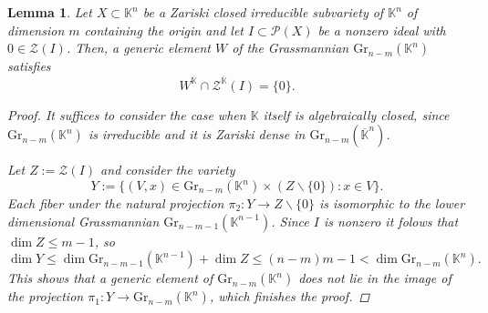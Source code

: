 \documentclass[10pt,a4paper]{amsart}
\newtheorem{lem}{Lemma}
\newcommand{\K}{\mathbb{K}}
\newcommand{\PP}{\mathcal{P}}
\newcommand{\Z}{\mathcal{Z}}
\begin{document}
\begin{lem}\label{generic}
Let $X\subset \K^n$ be a Zariski closed irreducible subvariety of $\K^n$ of dimension $m$ containing the origin and let $I\subset \PP(X)$ be a nonzero ideal with $0\in\Z(I)$. Then, a generic element $W$ of the Grassmannian $\mathrm{Gr}_{n-m}(\K^n)$ satisfies
\begin{equation*}
   W^{\overline{\K}}\cap \Z^{\overline{\K}}(I)=\{0\}.  
\end{equation*}
\begin{proof}
It suffices to consider the case when $\K$ itself is algebraically closed, since $\mathrm{Gr}_{n-m}(\K^n)$ is irreducible and it is Zariski dense in $\mathrm{Gr}_{n-m}(\overline{\K}^n)$. 

 

Let $Z:=\Z(I)$ and consider the variety
\begin{equation*}
    Y:=\{(V,x)\in\mathrm{Gr}_{n-m}(\K^n)\times (Z\backslash \{0\}):x\in V\}. 
\end{equation*}
Each fiber under the natural projection $\pi_2:Y\rightarrow Z\backslash \{0\}$ is isomorphic to the lower dimensional Grassmannian $\mathrm{Gr}_{n-m-1}(\K^{n-1})$. Since $I$ is nonzero it folows that $\dim Z\leq m-1$, so 
\begin{equation*}
    \dim Y\leq \dim \mathrm{Gr}_{n-m-1}(\K^{n-1})+\dim Z\leq(n-m)m-1<\dim \mathrm{Gr}_{n-m}(\K^n).
\end{equation*}
This shows that a generic element of $\mathrm{Gr}_{n-m}(\K^n)$ does not lie in the image of the projection $\pi_1:Y\rightarrow \mathrm{Gr}_{n-m}(\K^n)$, which finishes the proof.
\end{proof}
\end{lem}
\end{document}
